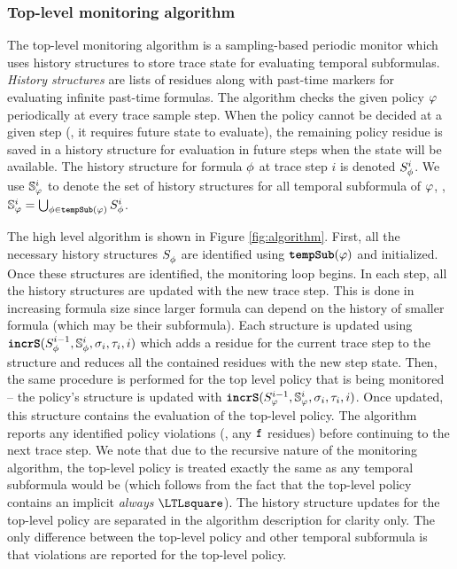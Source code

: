 \subsubsection{Top-level monitoring algorithm}
The top-level monitoring algorithm \monitor is a sampling-based periodic monitor which uses history structures to store trace state for evaluating temporal subformulas. 
\emph{History structures} are lists of residues along with past-time markers for evaluating infinite past-time formulas. 
The algorithm checks the given policy $\policy$ periodically at every trace sample step. 
When the policy cannot be decided at a given step (\eg, it requires future state to evaluate), the remaining policy residue is saved in a history structure for evaluation in future steps when the state will be available. 
The history structure for formula $\policyv$ at trace step $i$ is denoted $\histst[\policyv]{i}$. 
We use $\histSt[\policy]{i}$ to denote the set of history structures for all temporal subformula of $\policy$, \ie, 
$\histSt[\policy]{i} = \bigcup_{\policyv \in \tempSub(\policy)} \histst[\policyv]{i}$.

The high level algorithm \monitor is shown in Figure \ref{fig:algorithm}. 
%
First, all the necessary history structures $\histst[\policyv]{ }$ are identified using $\tempSub(\policy)$ and initialized. 
Once these structures are identified, the monitoring loop begins.
%
In each step, all the history structures are updated with the new trace step. 
This is done in increasing formula size since larger formula can depend on the history of smaller formula (which may be their subformula).
%
Each structure is updated using $\incrS(\histst[\policyv]{i-1},\histSt[\policyv]{i}, \sigma_i, \tau_i, i)$ which adds a residue for the current trace step to the structure and reduces all the contained residues with the new step state. 
Then, the same procedure is performed for the top level policy that is being monitored -- the policy's structure is updated with $\incrS(\histst{i-1},\histSt{i},\sigma_i,\tau_i, i)$.
Once updated, this structure contains the evaluation of the top-level policy. The algorithm reports any identified policy violations (\ie, any $\false$ residues) before continuing to the next trace step.
%
We note that due to the recursive nature of the monitoring algorithm, the top-level policy is treated exactly the same as any temporal subformula would be (which follows from the fact that the top-level policy contains an implicit \emph{always} $\henceforth$). 
The history structure updates for the top-level policy are separated in the algorithm description for clarity only.
The only difference between the top-level policy and other temporal subformula is that violations are reported for the top-level policy. 

